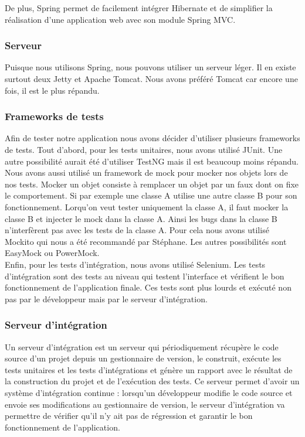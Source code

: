 De plus, Spring permet de facilement intégrer Hibernate et de simplifier la réalisation d'une application web avec son module Spring MVC.

\subsubsection{Serveur}

Puisque nous utilisons Spring, nous pouvons utiliser un serveur léger. Il en existe surtout deux Jetty et Apache Tomcat. Nous avons préféré Tomcat car encore une fois, il est le plus répandu.

\subsubsection{Frameworks de tests}

Afin de tester notre application nous avons décider d'utiliser plusieurs frameworks de tests. Tout d'abord, pour les tests unitaires, nous avons utilisé JUnit. Une autre possibilité aurait été d'utiliser TestNG mais il est beaucoup moins répandu.\\

Nous avons aussi utilisé un framework de mock pour \flqq{}mocker\frqq{} nos objets lors de nos tests. Mocker un objet consiste à remplacer un objet par un faux dont on fixe le comportement. Si par exemple une classe A utilise une autre classe B pour son fonctionnement. Lorqu'on veut tester uniquement la classe A, il faut mocker la classe B et injecter le mock dans la classe A. Ainsi les bugs dans la classe B n'interfèrent pas avec les tests de la classe A. Pour cela nous avons utilisé Mockito qui nous a été recommandé par Stéphane. Les autres possibilités sont EasyMock ou PowerMock.\\

Enfin, pour les tests d'intégration, nous avons utilisé Selenium. Les tests d'intégration sont des tests au niveau qui testent l'interface et vérifient le bon fonctionnement de l'application finale. Ces tests sont plus lourds et exécuté non pas par le développeur mais par le serveur d'intégration.

\subsubsection{Serveur d'intégration}

Un serveur d'intégration est un serveur qui périodiquement récupère le code source d'un projet depuis un gestionnaire de version, le construit, exécute les tests unitaires et les tests d'intégrations et génère un rapport avec le résultat de la construction du projet et de l'exécution des tests. Ce serveur permet d'avoir un système d'intégration continue : lorsqu'un développeur modifie le code source et envoie ses modifications au gestionnaire de version, le serveur d'intégration va permettre de vérifier qu'il n'y ait pas de régression et garantir le bon fonctionnement de l'application.\\

